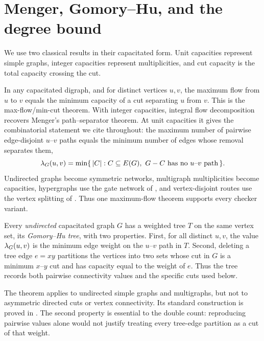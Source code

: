 \clearpage
{}

\section{Menger, Gomory--Hu, and the degree bound}

We use two classical results in their capacitated form. Unit capacities represent simple graphs, integer capacities represent multiplicities, and cut capacity is the total capacity crossing the cut.

\begin{theorem}\label{thm:menger}
In any capacitated digraph, and for distinct vertices $u, v$, the maximum flow from $u$ to $v$ equals the minimum capacity of a cut separating $u$ from $v$. This is the max-flow/min-cut theorem. With integer capacities, integral flow decomposition recovers Menger's path--separator theorem. At unit capacities it gives the combinatorial statement we cite throughout: the maximum number of pairwise edge-disjoint $u$--$v$ paths equals the minimum number of edges whose removal separates them,
\[
    \lambda_G(u, v) = \min\{\, |C| : C \subseteq E(G),\ G - C \text{ has no } u\text{--}v \text{ path} \,\}.
\]
Undirected graphs become symmetric networks, multigraph multiplicities become capacities, hypergraphs use the gate network of , and vertex-disjoint routes use the vertex splitting of . Thus one maximum-flow theorem supports every checker variant.
\end{theorem}

\begin{theorem}\label{thm:gomory-hu}
Every \emph{undirected} capacitated graph $G$ has a weighted tree $T$ on the same vertex set, its \emph{Gomory--Hu tree}, with two properties. First, for all distinct $u,v$, the value $\lambda_G(u,v)$ is the minimum edge weight on the $u$--$v$ path in $T$. Second, deleting a tree edge $e=xy$ partitions the vertices into two sets whose cut in $G$ is a minimum $x$--$y$ cut and has capacity equal to the weight of $e$. Thus the tree records both pairwise connectivity values and the specific cuts used below.
\end{theorem}

The theorem applies to undirected simple graphs and multigraphs, but not to asymmetric directed cuts or vertex connectivity. Its standard construction is proved in \cite{GomoryHu61}. The second property is essential to the double count: reproducing pairwise values alone would not justify treating every tree-edge partition as a cut of that weight.

